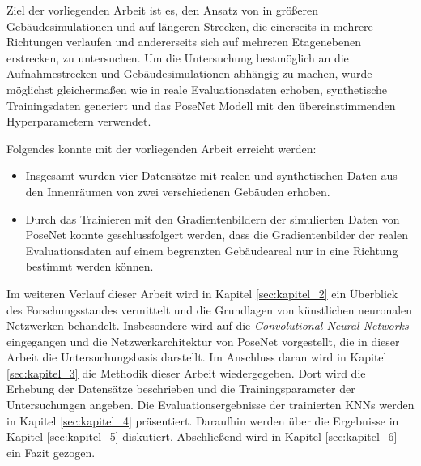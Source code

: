 Ziel der vorliegenden Arbeit ist es, den Ansatz von \citet{acharyaBIMPoseNetIndoorCamera2019} in größeren Gebäudesimulationen und auf längeren Strecken, die einerseits in mehrere Richtungen verlaufen und andererseits sich auf mehreren Etagenebenen erstrecken, zu untersuchen. Um die Untersuchung bestmöglich an die Aufnahmestrecken und Gebäudesimulationen abhängig zu machen, wurde möglichst gleichermaßen wie in \cite{acharyaBIMPoseNetIndoorCamera2019} reale Evaluationsdaten erhoben, synthetische Trainingsdaten generiert und das PoseNet Modell mit den übereinstimmenden Hyperparametern verwendet.

Folgendes konnte mit der vorliegenden Arbeit erreicht werden:
\begin{itemize}
	\item
	Insgesamt wurden vier Datensätze mit realen und synthetischen Daten aus den Innenräumen von zwei verschiedenen Gebäuden erhoben.
	\item 
	 Durch das Trainieren mit den Gradientenbildern der simulierten Daten von PoseNet konnte geschlussfolgert werden, dass die Gradientenbilder der realen Evaluationsdaten auf einem begrenzten Gebäudeareal nur in eine Richtung bestimmt werden können.
\end{itemize}





Im weiteren Verlauf dieser Arbeit wird in Kapitel \ref{sec:kapitel_2} ein Überblick des Forschungsstandes vermittelt und die Grundlagen von künstlichen neuronalen Netzwerken behandelt. Insbesondere wird auf die \textit{Convolutional Neural Networks} eingegangen und die Netzwerkarchitektur von PoseNet vorgestellt, die in dieser Arbeit die Untersuchungsbasis darstellt. Im Anschluss daran wird in Kapitel \ref{sec:kapitel_3} die Methodik dieser Arbeit wiedergegeben. Dort wird die Erhebung der Datensätze beschrieben und die Trainingsparameter der Untersuchungen angeben. Die Evaluationsergebnisse der trainierten KNNs werden in Kapitel \ref{sec:kapitel_4} präsentiert. Daraufhin werden über die Ergebnisse in Kapitel \ref{sec:kapitel_5} diskutiert. Abschließend wird in Kapitel \ref{sec:kapitel_6} ein Fazit gezogen. 


